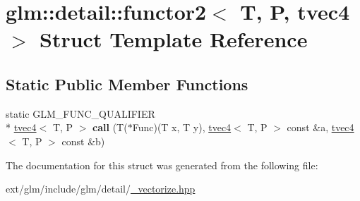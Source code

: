 \hypertarget{structglm_1_1detail_1_1functor2_3_01_t_00_01_p_00_01tvec4_01_4}{\section{glm\-:\-:detail\-:\-:functor2$<$ T, P, tvec4 $>$ Struct Template Reference}
\label{structglm_1_1detail_1_1functor2_3_01_t_00_01_p_00_01tvec4_01_4}
}
\subsection*{Static Public Member Functions}
\begin{DoxyCompactItemize}
\item 
\hypertarget{structglm_1_1detail_1_1functor2_3_01_t_00_01_p_00_01tvec4_01_4_a27fb8a00559c0caa02b7e5892301922f}{static G\-L\-M\-\_\-\-F\-U\-N\-C\-\_\-\-Q\-U\-A\-L\-I\-F\-I\-E\-R \\*
\hyperlink{structglm_1_1tvec4}{tvec4}$<$ T, P $>$ {\bfseries call} (T($\ast$Func)(T x, T y), \hyperlink{structglm_1_1tvec4}{tvec4}$<$ T, P $>$ const \&a, \hyperlink{structglm_1_1tvec4}{tvec4}$<$ T, P $>$ const \&b)}\label{structglm_1_1detail_1_1functor2_3_01_t_00_01_p_00_01tvec4_01_4_a27fb8a00559c0caa02b7e5892301922f}

\end{DoxyCompactItemize}


The documentation for this struct was generated from the following file\-:\begin{DoxyCompactItemize}
\item 
ext/glm/include/glm/detail/\hyperlink{__vectorize_8hpp}{\-\_\-vectorize.\-hpp}\end{DoxyCompactItemize}
